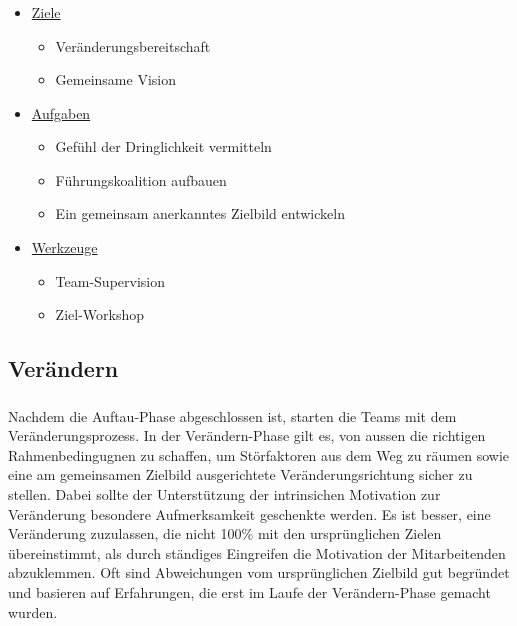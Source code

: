 \documentclass[aspectratio=169]{beamer}
\begin{document}
\begin{frame}
\frametitle{\subsecname}\framesubtitle{\secname}
\begin{itemize}
\setlength\itemsep{1em}
\item[\color{ice-blue}\SnowflakeChevron]\underline{Ziele}
\begin{itemize}
  \item Veränderungsbereitschaft
  \item Gemeinsame Vision
\end{itemize}
\item[\color{ice-blue}\SnowflakeChevron]\underline{Aufgaben}
\begin{itemize}
  \item Gefühl der Dringlichkeit vermitteln
  \item Führungskoalition aufbauen
  \item Ein gemeinsam anerkanntes Zielbild entwickeln
\end{itemize}
\item[\color{ice-blue}\SnowflakeChevron]\underline{Werkzeuge}
\begin{itemize}
  \item Team-Supervision
  \item Ziel-Workshop
\end{itemize}
\end{itemize}
\end{frame}

\subsection{Verändern}
\begin{frame}
\frametitle{\subsecname}\framesubtitle{\secname}
Nachdem die Auftau-Phase abgeschlossen ist, starten die Teams mit dem Veränderungsprozess. In der Verändern-Phase gilt es, von aussen die richtigen Rahmenbedingugnen zu schaffen, um Störfaktoren aus dem Weg zu räumen sowie eine am gemeinsamen Zielbild ausgerichtete Veränderungsrichtung sicher zu stellen. Dabei sollte der Unterstützung der intrinsichen Motivation zur Veränderung besondere Aufmerksamkeit geschenkte werden. Es ist besser, eine Veränderung zuzulassen, die nicht 100\% mit den ursprünglichen Zielen übereinstimmt, als durch ständiges Eingreifen die Motivation der Mitarbeitenden abzuklemmen. Oft sind Abweichungen vom ursprünglichen Zielbild gut begründet und basieren auf Erfahrungen, die erst im Laufe der Verändern-Phase gemacht wurden.
\end{frame}
\end{document}
